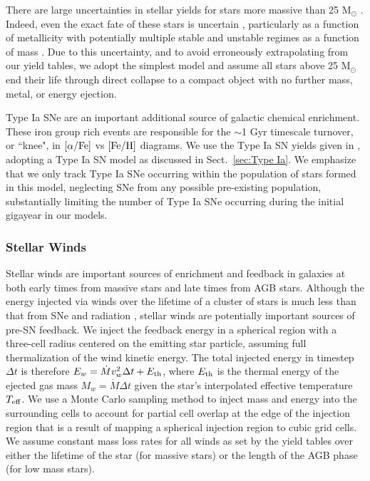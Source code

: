 \documentclass[twocolumn]{aastex61}
\begin{document}
There are large uncertainties in stellar yields for stars more massive than 25 M$_{\odot}$ \citep[see ][and references therein]{Cote2016}. Indeed, even the exact fate of these stars is uncertain \citep[e.g.][]{Woosley2002,Zhang2008,Ugliano2012}, particularly as a function of metallicity \citep{Fryer2012} with potentially multiple stable and unstable regimes as a function of mass \citep{Heger2003}. Due to this uncertainty, and to avoid erroneously extrapolating from our yield tables, we adopt the simplest model and assume all stars above 25 M$_{\odot}$ end their life through direct collapse to a compact object with no further mass, metal, or energy ejection.

Type Ia SNe are an important additional source of galactic chemical enrichment. These iron group rich events are responsible for the $\sim$1 Gyr timescale turnover, or ``knee", in $[\alpha/\rm{Fe}]$ vs $[\rm{Fe}/\rm{H}]$ diagrams. We use the Type Ia SN yields given in \citet{Thielemann1986}, adopting a Type Ia SN model as discussed in Sect.~\ref{sec:Type Ia}. We emphasize that we only track Type Ia SNe occurring within the population of stars formed in this model, neglecting SNe from any possible pre-existing population, substantially limiting the number of Type Ia SNe occurring during the initial gigayear in our models.

\subsubsection{Stellar Winds}
\label{sec:stellar winds}
Stellar winds are important sources of enrichment and feedback in galaxies at both early times from massive stars and late times from AGB stars. Although the energy injected via winds over the lifetime of a cluster of stars is much less than that from SNe and radiation \citep{Shull1995}, stellar winds are potentially important sources of pre-SN feedback. We inject the feedback energy in a spherical region with a three-cell radius centered on the emitting star particle, assuming full thermalization of the wind kinetic energy. The total injected energy in timestep $\Delta t$ is therefore $E_w = \dot{M}  v^2_w\Delta t  + E_{\rm th}$, where $E_{\rm th}$ is the thermal energy of the ejected gas mass $M_w = \dot{M}\Delta t$ given the star's interpolated effective temperature $T_{\rm eff}$. We use a Monte Carlo sampling method to inject mass and energy into the surrounding cells to account for partial cell overlap at the edge of the injection region that is a result of mapping a spherical injection region to cubic grid cells. We assume constant mass loss rates for all winds as set by the yield tables over either the lifetime of the star (for massive stars) or the length of the AGB phase (for low mass stars). 
\end{document}
